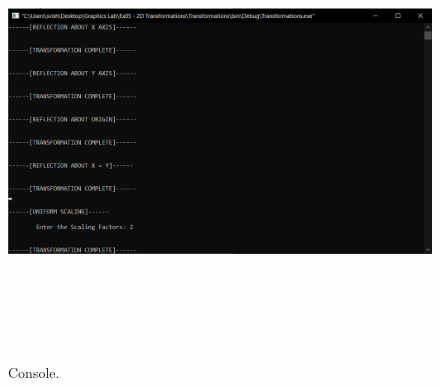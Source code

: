 \documentclass[12pt, a4]{article}
\begin{document}
\subsection*{}
\begin{figure}[h]
\centering
\caption{Console.}
\includegraphics[height=12cm, width=17cm]{Outputs/Console-9.png}
\end{figure}

\newpage
\end{document}
